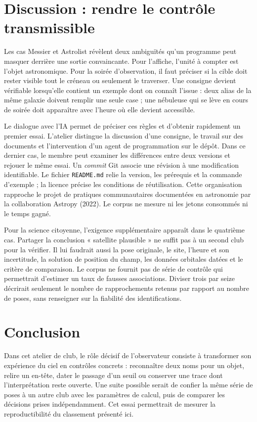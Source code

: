 \documentclass[11pt,letterpaper]{article}
\begin{document}
\section{Discussion : rendre le contrôle transmissible}
Les cas Messier et Astrolist révèlent deux ambiguïtés qu'un programme peut masquer derrière une sortie convaincante. Pour l'affiche, l'unité à compter est l'objet astronomique. Pour la soirée d'observation, il faut préciser si la cible doit rester visible tout le créneau ou seulement le traverser. Une consigne devient vérifiable lorsqu'elle contient un exemple dont on connaît l'issue : deux alias de la même galaxie doivent remplir une seule case ; une nébuleuse qui se lève en cours de soirée doit apparaître avec l'heure où elle devient accessible.

Le dialogue avec l'IA permet de préciser ces règles et d'obtenir rapidement un premier essai. L'atelier distingue la discussion d'une consigne, le travail sur des documents et l'intervention d'un agent de programmation sur le dépôt. Dans ce dernier cas, le membre peut examiner les différences entre deux versions et rejouer le même essai. Un \emph{commit} Git associe une révision à une modification identifiable. Le fichier \texttt{README.md} relie la version, les prérequis et la commande d'exemple ; la licence précise les conditions de réutilisation. Cette organisation rapproche le projet de pratiques communautaires documentées en astronomie par la collaboration Astropy (2022). Le corpus ne mesure ni les jetons consommés ni le temps gagné.

Pour la science citoyenne, l'exigence supplémentaire apparaît dans le quatrième cas. Partager la conclusion « satellite plausible » ne suffit pas à un second club pour la vérifier. Il lui faudrait aussi la pose originale, le site, l'heure et son incertitude, la solution de position du champ, les données orbitales datées et le critère de comparaison. Le corpus ne fournit pas de série de contrôle qui permettrait d'estimer un taux de fausses associations. Diviser trois par seize décrirait seulement le nombre de rapprochements retenus par rapport au nombre de poses, sans renseigner sur la fiabilité des identifications.

\section{Conclusion}
Dans cet atelier de club, le rôle décisif de l'observateur consiste à transformer son expérience du ciel en contrôles concrets : reconnaître deux noms pour un objet, relire un en-tête, dater le passage d'un seuil ou conserver une trace dont l'interprétation reste ouverte. Une suite possible serait de confier la même série de poses à un autre club avec les paramètres de calcul, puis de comparer les décisions prises indépendamment. Cet essai permettrait de mesurer la reproductibilité du classement présenté ici.
\end{document}
